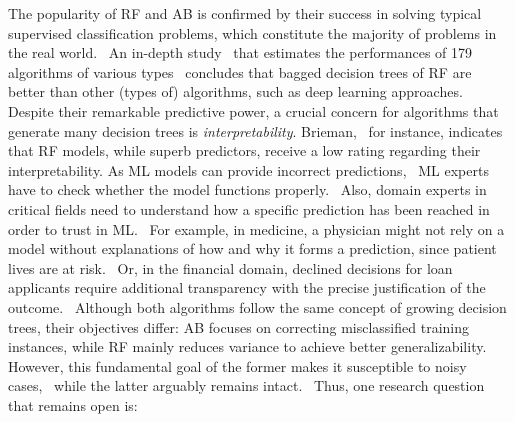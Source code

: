 The popularity of RF and AB is confirmed by their success in solving typical supervised classification problems, which constitute the majority of problems in the real world.~\cite{Opitz1999Popular,Wyner2017Explaining} An in-depth study~\cite{Delgado2014Do} that estimates the performances of 179 algorithms of various types~\cite{Dua2017} concludes that bagged decision trees of RF are better than other (types of) algorithms, such as deep learning approaches. 
%
Despite their remarkable predictive power, a crucial concern for algorithms that generate many decision trees is \emph{interpretability}. Brieman,~\cite{Breiman2001Statistical} for instance, indicates that RF models, while superb predictors, receive a low rating regarding their interpretability. As ML models can provide incorrect predictions,~\cite{Caruana2015Intelligible} ML experts have to check whether the model functions properly.~\cite{Tam2017An} Also, domain experts in critical fields need to understand how a specific prediction has been reached in order to trust in ML.~\cite{Zhou20182D} For example, in medicine, a physician might not rely on a model without explanations of how and why it forms a prediction, since patient lives are at risk.~\cite{Ribeiro2016Why,Hastie2001The,Lakkaraju2016Interpretable} Or, in the financial domain, declined decisions for loan applicants require additional transparency with the precise justification of the outcome.~\cite{Sachan2020An}
Although both algorithms follow the same concept of growing decision trees, their objectives differ: AB focuses on correcting misclassified training instances, while RF mainly reduces variance to achieve better generalizability. However, this fundamental goal of the former makes it susceptible to noisy cases,~\cite{Bauer1999Empirical} while the latter arguably remains intact.~\cite{Kotsiantis2007Combining}
Thus, one research question that remains open is: 
%
